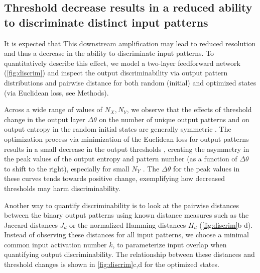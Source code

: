 \subsection{Threshold decrease results in a reduced ability to discriminate distinct input patterns}
It is expected that
    This downstream amplification may lead to reduced resolution
        and thus a decrease in the ability to discriminate input patterns.
    To quantitatively describe this effect, we model a two-layer feedforward network (\autoref{fig:discrim})
        and inspect the output discriminability via output pattern distributions
        and pairwise distance for both random (initial) and optimized states (via Euclidean loss, see Methods).

Across a wide range of values of $N_X, N_Y$, we observe that
        the effects of threshold change in the output layer $\Delta \theta$
        on the number of unique output patterns and on output entropy
        in the random initial states
        are generally symmetric
        .
    The optimization process via minimization of the Euclidean loss for output patterns
        results in a small decrease in the output thresholds
        ,
        creating the asymmetry in the peak values of the output entropy and pattern number
            (as a function of $\Delta \theta$ to shift to the right),
        especially for small $N_Y$
        .
    The $\Delta \theta$ for the peak values in these curves tends towards positive change,
        exemplifying how decreased thresholds may harm discriminability.



Another way to quantify discriminability is to look at the pairwise distances between the binary output patterns
        using known distance measures such as
            the Jaccard distances $J_d$
            or the normalized Hamming distances $H_d$
            (\autoref{fig:discrim}b-d).
    Instead of observing these distances for all input patterns, we choose
        a minimal common input activation number $k$,
        to parameterize input overlap when quantifying output discriminability.
    The relationship between these distances and threshold changes is shown in \autoref{fig:discrim}c,d for the optimized states.

